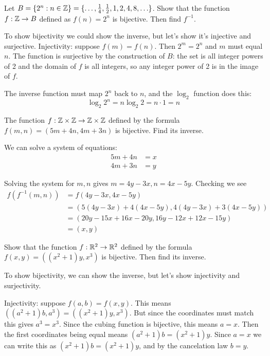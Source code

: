 \documentclass{article}
\begin{document}
\begin{problem}
Let $B = \{2^n : n \in \mathbb{Z}\} = \{\ldots, \frac{1}{4}, \frac{1}{2}, 1, 2, 4, 8, \ldots\}$. Show that the function $f: \mathbb{Z} \to B$ defined as $f(n) = 2^n$ is bijective. Then find $f^{-1}$.
\end{problem}

To show bijectivity we could show the inverse, but let's show it's injective and surjective. Injectivity: suppose $f(m) = f(n)$. Then $2^m = 2^n$ and $m$ must equal $n$. The function is surjective by the construction of $B$: the set is all integer powers of 2 and the domain of $f$ is all integers, so any integer power of 2 is in the image of $f$.

The inverse function must map $2^n$ back to $n$, and the $\log_2$ function does this:
$$\log_2 2^n = n \log_2 2 = n\cdot 1 = n$$

\begin{problem}
The function $f: \mathbb{Z} \times\mathbb{Z} \to \mathbb{Z} \times \mathbb{Z}$ defined by the formula $f(m, n) = (5m + 4n, 4m + 3n)$ is bijective. Find its inverse.
\end{problem}

We can solve a system of equations:
\begin{align*}
  5m +  4n & = x \\
  4m +  3n & = y
\end{align*}

Solving the system for $m, n$ gives $m = 4y - 3x, n = 4x - 5y$. Checking we see
\begin{align*}
  f(f^{-1}(m, n)) & = f(4y - 3x, 4x - 5y)                                \\
                  & = (5(4y - 3x) + 4(4x - 5y), 4(4y - 3x) + 3(4x - 5y)) \\
                  & = (20y - 15x + 16x - 20y, 16y - 12x + 12x - 15y)     \\
                  & = (x, y)
\end{align*}
\begin{problem}
Show that the function $f: \mathbb{R}^2 \to \mathbb{R}^2$ defined by the formula $f(x, y) = ((x^2+ 1)y, x^3)$ is bijective. Then find its inverse.
\end{problem}

To show bijectivity, we can show the inverse, but let's show injectivity and surjectivity.

Injectivity: suppose $f(a,b) = f(x, y)$. This means $((a^2 + 1)b, a^3) = ((x^2 + 1)y, x^3)$. But since the coordinates must match this gives $a^3 = x^3$. Since the cubing function is bijective, this means $a = x$. Then the first coordinates being equal means $(a^2 + 1)b = (x^2 + 1)y$. Since $a = x$ we can write this as $(x^2 + 1)b = (x^2 + 1)y$, and by the cancelation law $b = y$.
\end{document}
